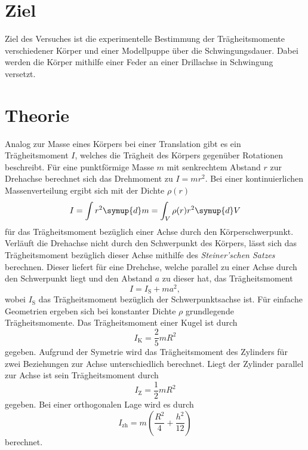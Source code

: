 \section{Ziel}
\label{sec:Ziel}
Ziel des Versuches ist die experimentelle Bestimmung der Trägheitsmomente verschiedener Körper und einer Modellpuppe über die Schwingungsdauer. Dabei werden die Körper 
mithilfe einer Feder an einer Drillachse in Schwingung versetzt.

\section{Theorie}
\label{sec:Theorie}
Analog zur Masse eines Körpers bei einer Translation gibt es ein Trägheitsmoment $I$, welches die Trägheit des Körpers gegenüber Rotationen beschreibt. Für eine punktförmige
Masse $m$ mit senkrechtem Abstand $r$ zur Drehachse berechnet sich das Drehmoment zu $I = mr^2$. Bei einer kontinuierlichen Massenverteilung ergibt sich mit der 
Dichte $\rho(r)$
\begin{equation}
    \label{eqn:Trägheitsmoment}
    I = \int r^2 \symup{d}m = \int_V \rho(r) r^2 \symup{d}V
\end{equation}
für das Trägheitsmoment bezüglich einer Achse durch den Körperschwerpunkt. Verläuft die Drehachse nicht durch den Schwerpunkt des Körpers, lässt sich das Trägheitsmoment 
bezüglich dieser Achse mithilfe des \textit{Steiner'schen Satzes} berechnen. Dieser liefert für eine Drehchse, welche parallel zu einer Achse durch den Schwerpunkt liegt und den Abstand
$a$ zu dieser hat, das Trägheitsmoment 
\begin{equation}
    \label{eqn:Steiner}
    I = I_\text{S} + ma^2,
\end{equation}    
wobei $I_\text{S}$ das Trägheitsmoment bezüglich der Schwerpunktsachse ist.
Für einfache Geometrien ergeben sich bei konstanter Dichte $\rho$ grundlegende Trägheitsmomente. Das Trägheitsmoment einer Kugel ist durch
\begin{equation}
    \label{eqn:I_Kugel}
    I_\text{K} = \frac{2}{5}mR^2
\end{equation}
gegeben. Aufgrund der Symetrie wird das Trägheitsmoment des Zylinders für zwei Beziehungen zur Achse unterschiedlich berechnet. Liegt der Zylinder parallel zur Achse ist sein Trägheitsmoment durch
\begin{equation}
    \label{eqn:I_Zp}
    I_\text{Z} = \frac{1}{2}mR^2
\end{equation}
gegeben. Bei einer orthogonalen Lage wird es durch 
\begin{equation}
    \label{eqn:I_Zh}
    I_\text{zh} = m\left(\frac{R^2}{4}+\frac{h^2}{12}\right)
\end{equation}
berechnet.

